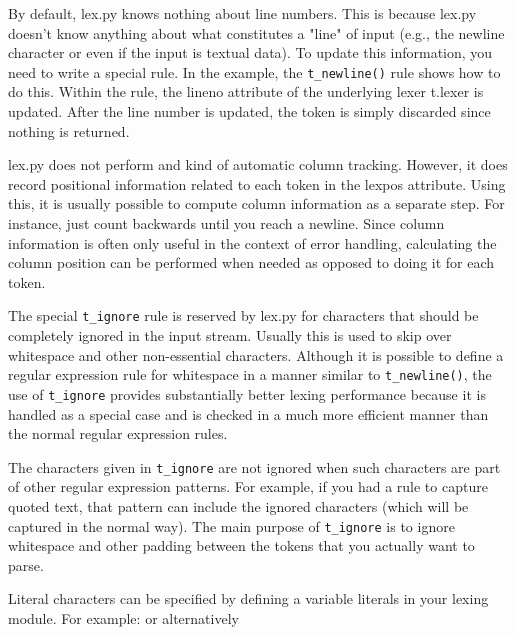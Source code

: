 
By default, lex.py knows nothing about line numbers. This is because lex.py
doesn't know anything about what constitutes a "line" of input (e.g., the
newline character or even if the input is textual data). To update this
information, you need to write a special rule. In the example, the
\verb|t_newline()| rule shows how to do this.
Within the rule, the lineno attribute of the underlying lexer t.lexer is
updated. After the line number is updated, the token is simply discarded since
nothing is returned.

lex.py does not perform and kind of automatic column tracking. However, it does
record positional information related to each token in the lexpos attribute.
Using this, it is usually possible to compute column information as a separate
step. For instance, just count backwards until you reach a newline.
Since column information is often only useful in the context of error handling,
calculating the column position can be performed when needed as opposed to doing
it for each token.


The special \verb|t_ignore| rule is reserved by lex.py for characters that
should be completely ignored in the input stream. Usually this is used to skip
over whitespace and other non-essential characters. Although it is possible to
define a regular expression rule for whitespace in a manner similar to
\verb|t_newline()|, the use of \verb|t_ignore| provides substantially better
lexing performance because it is handled as a special case and is checked in a
much more efficient manner than the normal regular expression rules.

The characters given in \verb|t_ignore| are not ignored when such characters are
part of other regular expression patterns. For example, if you had a rule to
capture quoted text, that pattern can include the ignored characters (which will
be captured in the normal way). The main purpose of \verb|t_ignore| is to ignore
whitespace and other padding between the tokens that you actually want to parse.


Literal characters can be specified by defining a variable literals in your
lexing module. For example:
or alternatively

